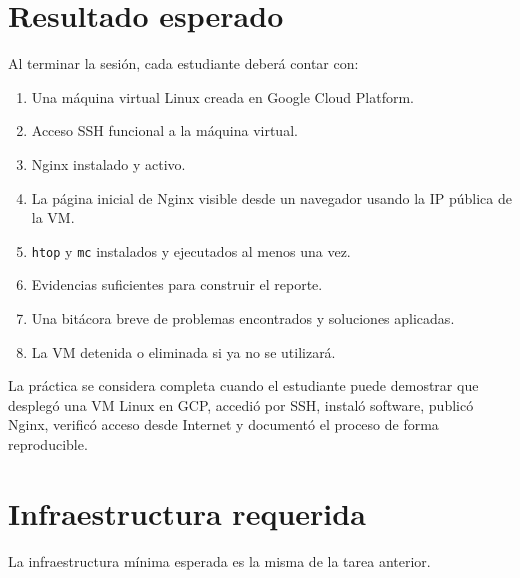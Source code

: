 \documentclass[
  coursetitle={Cómputo Nube y Tecnologías Emergentes},
  coursehours={96},
  coursedate={Verano 2026},
  doctype={Práctica},
  otherlangs={english,french},
  authorname={Lázaro},
  authorsurname={Bustio-Martínez},
  authortitle={PhD},
  role={Profesor Investigador},
  email={lbustio@inaoe.mx},
  phone={5559504000},
  ext={7459},
  institution={Instituto Nacional de Astrofísica, Óptica y Electrónica (INAOE)},
  department={Maestría en Ciencias en Tecnologías de Seguridad},
  address={Luis Enrique Erro 1, Sta. Ma. Tonantzintla, San Andrés Cholula, CP 72840, Puebla, México},
  margin={0.5in}
]{../../lbustio_lecture_notes}
\begin{document}
\section{Resultado esperado}

Al terminar la sesión, cada estudiante deberá contar con:

\begin{enumerate}
    \item Una máquina virtual Linux creada en Google Cloud Platform.
    \item Acceso SSH funcional a la máquina virtual.
    \item Nginx instalado y activo.
    \item La página inicial de Nginx visible desde un navegador usando la IP pública de la VM.
    \item \texttt{htop} y \texttt{mc} instalados y ejecutados al menos una vez.
    \item Evidencias suficientes para construir el reporte.
    \item Una bitácora breve de problemas encontrados y soluciones aplicadas.
    \item La VM detenida o eliminada si ya no se utilizará.
\end{enumerate}

\begin{tcolorbox}[title=Producto de la práctica,colback=cloudblue!5,colframe=cloudblue]
La práctica se considera completa cuando el estudiante puede demostrar que desplegó una VM Linux en GCP, accedió por SSH, instaló software, publicó Nginx, verificó acceso desde Internet y documentó el proceso de forma reproducible.
\end{tcolorbox}

\section{Infraestructura requerida}

La infraestructura mínima esperada es la misma de la tarea anterior.
\end{document}
